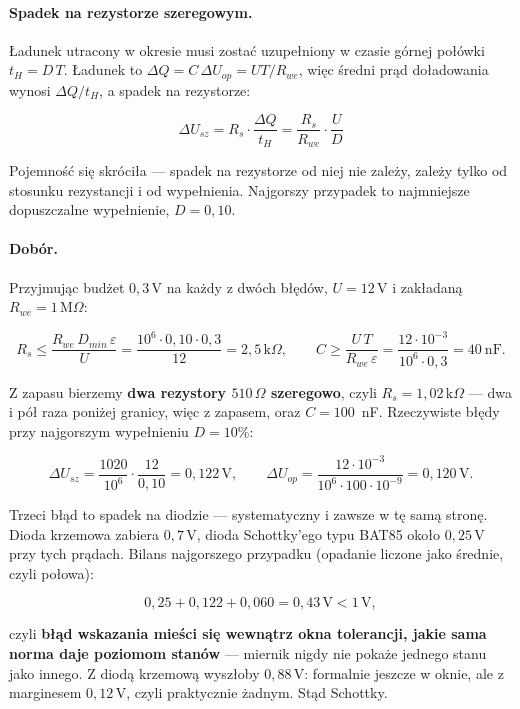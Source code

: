 \documentclass[a4paper,11pt]{article}
\newcommand{\ohm}{\,\Omega}
\newcommand{\kohm}{\,\mathrm{k}\Omega}
\newcommand{\Mohm}{\,\mathrm{M}\Omega}
\newcommand{\volt}{\,\mathrm{V}}
\begin{document}
\paragraph{Spadek na rezystorze szeregowym.} Ładunek utracony w okresie musi zostać
uzupełniony w czasie górnej połówki $t_H = D\,T$. Ładunek to
$\Delta Q = C\,\Delta U_{op} = U T/R_{we}$, więc średni prąd doładowania wynosi
$\Delta Q/t_H$, a spadek na rezystorze:

\begin{equation}
\Delta U_{sz}=R_s\cdot\frac{\Delta Q}{t_H}=\frac{R_s}{R_{we}}\cdot\frac{U}{D}
\label{eq:szereg}
\end{equation}

Pojemność się skróciła --- spadek na rezystorze od niej nie zależy, zależy tylko od
stosunku rezystancji i od wypełnienia. Najgorszy przypadek to najmniejsze
dopuszczalne wypełnienie, $D=0{,}10$.

\paragraph{Dobór.} Przyjmując budżet $0{,}3\volt$ na każdy z dwóch błędów,
$U=12\volt$ i zakładaną $R_{we}=1\Mohm$:

\[
R_s \le \frac{R_{we}\,D_{min}\,\varepsilon}{U}
     = \frac{10^6\cdot0{,}10\cdot0{,}3}{12}=2{,}5\kohm ,
\qquad
C \ge \frac{U\,T}{R_{we}\,\varepsilon}
   = \frac{12\cdot10^{-3}}{10^{6}\cdot0{,}3}=40\ \mathrm{nF}.
\]

Z zapasu bierzemy \textbf{dwa rezystory $510\ohm$ szeregowo}, czyli
$R_s=1{,}02\kohm$ --- dwa i pół raza poniżej granicy, więc z zapasem, oraz
$C=100$~nF. Rzeczywiste błędy przy najgorszym wypełnieniu $D=10\%$:

\[
\Delta U_{sz}=\frac{1020}{10^{6}}\cdot\frac{12}{0{,}10}=0{,}122\volt,
\qquad
\Delta U_{op}=\frac{12\cdot10^{-3}}{10^{6}\cdot100\cdot10^{-9}}=0{,}120\volt .
\]

Trzeci błąd to spadek na diodzie --- systematyczny i zawsze w tę samą stronę.
Dioda krzemowa zabiera $0{,}7\volt$, dioda Schottky'ego typu BAT85 około
$0{,}25\volt$ przy tych prądach. Bilans najgorszego przypadku (opadanie liczone
jako średnie, czyli połowa):

\[
0{,}25 + 0{,}122 + 0{,}060 = 0{,}43\volt < 1\volt ,
\]

czyli \textbf{błąd wskazania mieści się wewnątrz okna tolerancji, jakie sama norma
daje poziomom stanów} --- miernik nigdy nie pokaże jednego stanu jako innego.
Z diodą krzemową wyszłoby $0{,}88\volt$: formalnie jeszcze w oknie, ale
z marginesem $0{,}12\volt$, czyli praktycznie żadnym. Stąd Schottky.
\end{document}
